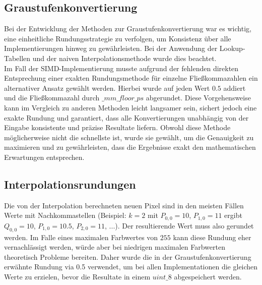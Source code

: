 \documentclass[course=erap]{aspdoc}
\begin{document}

\subsection{Graustufenkonvertierung}
Bei der Entwicklung der Methoden zur Graustufenkonvertierung war es wichtig, eine einheitliche Rundungsstrategie zu verfolgen, um Konsistenz über alle Implementierungen hinweg zu gewährleisten. Bei der Anwendung der Lookup-Tabellen und der naiven Interpolationsmethode wurde dies beachtet.\\
Im Fall der SIMD-Implementierung musste aufgrund der fehlenden direkten Entsprechung einer exakten Rundungsmethode für einzelne Fließkommazahlen ein alternativer Ansatz gewählt werden. Hierbei wurde auf jeden Wert $0.5$ addiert und die Fließkommazahl durch $\_mm\_floor\_ps$ abgerundet. Diese Vorgehensweise kann im Vergleich zu anderen Methoden leicht langsamer sein, sichert jedoch eine exakte Rundung und garantiert, dass alle Konvertierungen unabhängig von der Eingabe konsistente und präzise Resultate liefern. Obwohl diese Methode möglicherweise nicht die schnellste ist, wurde sie gewählt, um die Genauigkeit zu maximieren und zu gewährleisten, dass die Ergebnisse exakt den mathematischen Erwartungen entsprechen.

\subsection{Interpolationsrundungen}
Die von der Interpolation berechneten neuen Pixel sind in den meisten Fällen Werte mit Nachkommastellen (Beispiel: $k = 2$ mit $P_{0,0} = 10$, $P_{1,0} = 11$ ergibt $Q_{0,0} = 10$, $P_{1,0} = 10.5$, $P_{2,0} = 11$, $...$). Der resultierende Wert muss also gerundet werden. Im Falle eines maximalen Farbwertes von $255$ kann diese Rundung eher vernachlässigt werden, würde aber bei niedrigen maximalen Farbwerten theoretisch Probleme bereiten. Daher wurde die in der Graustufenkonvertierung erwähnte Rundung via 0.5 verwendet, um bei allen Implementationen die gleichen Werte zu erzielen, bevor die Resultate in einem $uint\_8$ abgespeichert werden.
\end{document}
